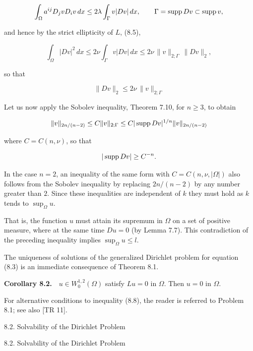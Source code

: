 \begin{theorem}
\[
\int_{\Omega} a^{ij}D_jvD_iv\,dx \le 2\lambda \int_{\Gamma} v|Dv|\,dx,
\qquad \Gamma = \operatorname{supp} Dv \subset \operatorname{supp} v,
\]

and hence by the strict ellipticity of $L$, (8.5),

\[
\int_{\Omega} |Dv|^2\,dx \le 2\nu \int_{\Gamma} v|Dv|\,dx \le 2\nu \,\|v\|_{2;\Gamma}\,\|Dv\|_2,
\]

so that

\[
\|Dv\|_2 \le 2\nu \,\|v\|_{2;\Gamma}
\]

Let us now apply the Sobolev inequality, Theorem 7.10, for $n \ge 3$, to obtain

\[
\|v\|_{2n/(n-2)} \le C\|v\|_{2;\Gamma} \le C|\operatorname{supp} Dv|^{1/n}\|v\|_{2n/(n-2)}
\]

where $C = C(n,\nu)$, so that

\[
|\operatorname{supp} Dv| \ge C^{-n}.
\]

In the case $n=2$, an inequality of the same form with $C=C(n,\nu,|\Omega|)$ also follows from the Sobolev inequality by replacing $2n/(n-2)$ by any number greater than $2$.
Since these inequalities are independent of $k$ they must hold as $k$ tends to $\sup_{\Omega} u$.

That is, the function $u$ must attain its supremum in $\Omega$ on a set of positive measure, where at the same time $Du = 0$ (by Lemma 7.7). This contradiction of the preceding inequality implies $\sup_{\Omega} u \le l$.

The uniqueness of solutions of the generalized Dirichlet problem for equation (8.3) is an immediate consequence of Theorem 8.1.

\end{theorem}

\begin{corollary}[Uniqueness in $W_0^{1,2}$]\label{gt-cor-8-2-uniqueness-zero}
\noindent\textbf{Corollary 8.2.}\ \ $u \in W_0^{1,2}(\Omega)$ satisfy $Lu=0$ in $\Omega$. Then $u=0$ in $\Omega$.
\end{corollary}

\medskip

For alternative conditions to inequality (8.8), the reader is referred to Problem 8.1; see also [TR 11].



8.2. Solvability of the Dirichlet Problem

8.2. Solvability of the Dirichlet Problem


